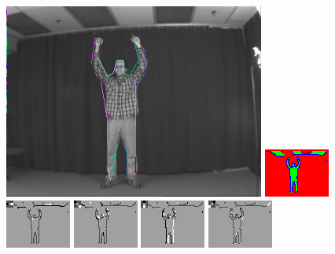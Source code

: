 \begin{figure}
\includegraphics[width=0.48 \linewidth]{output/2.detection/local_inference/out.s1.0080.d/thefinalparse.png}
\includegraphics[width=0.48 \linewidth]{output/2.detection/local_inference/out.s1.0080.d/local.x5.interior.png}
\includegraphics[width=0.24 \linewidth]{output/2.detection/local_inference/out.s1.0080.d/local.x5.orientations.0.png}
\includegraphics[width=0.24 \linewidth]{output/2.detection/local_inference/out.s1.0080.d/local.x5.orientations.1.png}
\includegraphics[width=0.24 \linewidth]{output/2.detection/local_inference/out.s1.0080.d/local.x5.orientations.2.png}
\includegraphics[width=0.24 \linewidth]{output/2.detection/local_inference/out.s1.0080.d/local.x5.orientations.3.png}

\end{figure}
